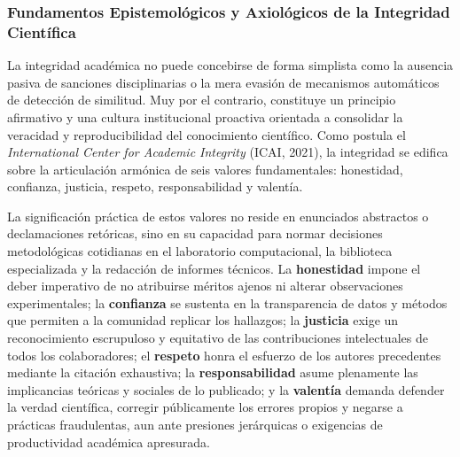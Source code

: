 \subsubsection{Fundamentos Epistemológicos y Axiológicos de la Integridad Científica}

La integridad académica no puede concebirse de forma simplista como la ausencia pasiva de sanciones disciplinarias o la mera evasión de mecanismos automáticos de detección de similitud. Muy por el contrario, constituye un principio afirmativo y una cultura institucional proactiva orientada a consolidar la veracidad y reproducibilidad del conocimiento científico. Como postula el \textit{International Center for Academic Integrity} (ICAI, 2021), la integridad se edifica sobre la articulación armónica de seis valores fundamentales: honestidad, confianza, justicia, respeto, responsabilidad y valentía.

La significación práctica de estos valores no reside en enunciados abstractos o declamaciones retóricas, sino en su capacidad para normar decisiones metodológicas cotidianas en el laboratorio computacional, la biblioteca especializada y la redacción de informes técnicos. La \textbf{honestidad} impone el deber imperativo de no atribuirse méritos ajenos ni alterar observaciones experimentales; la \textbf{confianza} se sustenta en la transparencia de datos y métodos que permiten a la comunidad replicar los hallazgos; la \textbf{justicia} exige un reconocimiento escrupuloso y equitativo de las contribuciones intelectuales de todos los colaboradores; el \textbf{respeto} honra el esfuerzo de los autores precedentes mediante la citación exhaustiva; la \textbf{responsabilidad} asume plenamente las implicancias teóricas y sociales de lo publicado; y la \textbf{valentía} demanda defender la verdad científica, corregir públicamente los errores propios y negarse a prácticas fraudulentas, aun ante presiones jerárquicas o exigencias de productividad académica apresurada.

